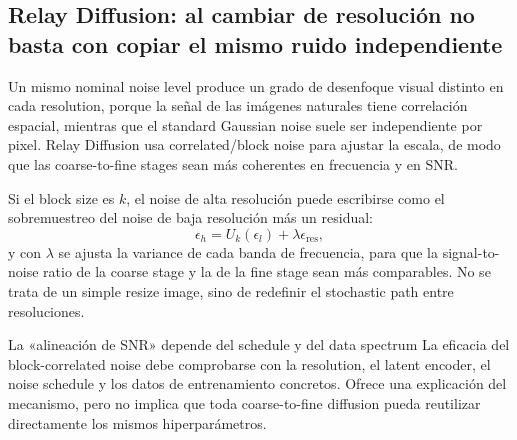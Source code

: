 
\subsection{Relay Diffusion: al cambiar de resolución no basta con copiar el mismo ruido independiente}

Un mismo nominal noise level produce un grado de desenfoque visual distinto en cada resolution, porque la señal de las imágenes naturales tiene correlación espacial, mientras que el standard Gaussian noise suele ser independiente por pixel. Relay Diffusion usa correlated/block noise para ajustar la escala, de modo que las coarse-to-fine stages sean más coherentes en frecuencia y en SNR.


Si el block size es $k$, el noise de alta resolución puede escribirse como el sobremuestreo del noise de baja resolución más un residual:
\[
\epsilon_h=U_k(\epsilon_l)+\lambda\epsilon_{\text{res}},
\]
y con $\lambda$ se ajusta la variance de cada banda de frecuencia, para que la signal-to-noise ratio de la coarse stage y la de la fine stage sean más comparables. No se trata de un simple resize image, sino de redefinir el stochastic path entre resoluciones.

\begin{warningbox}{La «alineación de SNR» depende del schedule y del data spectrum}
La eficacia del block-correlated noise debe comprobarse con la resolution, el latent encoder, el noise schedule y los datos de entrenamiento concretos. Ofrece una explicación del mecanismo, pero no implica que toda coarse-to-fine diffusion pueda reutilizar directamente los mismos hiperparámetros.
\end{warningbox}


